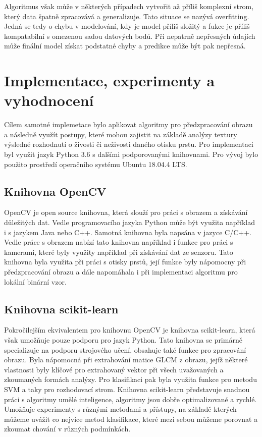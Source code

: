 Algoritmus však může v některých případech vytvořit až příliš komplexní strom, který data špatně zpracovává a generalizuje. Tato situace se nazývá overfitting. Jedná se tedy o chybu v modelování, kdy je model příliš složitý a fukce je příliš kompatabilní s omezenou sadou datových bodů. Při nepatrně nepřesných údajích může finální model získat podstatné chyby a predikce může být pak nepřesná.
    
\chapter{Implementace, experimenty a vyhodnocení}
Cílem samotné implemetace bylo aplikovat algoritmy pro předzpracování obrazu a následně využít postupy, které mohou zajistit na základě analýzy textury výsledné rozhodnutí o živosti či neživosti daného otisku prstu.
Pro implementaci byl využit jazyk Python 3.6 s dalšími podporovanými knihovnami. Pro vývoj bylo použito prostředí operačního systému Ubuntu 18.04.4 LTS.

\section{Knihovna OpenCV}
OpenCV je open source knihovna, která slouží pro práci s obrazem a získávání důležitých dat. Vedle programovacího jazyka Python může být využita například i s jazykem Java nebo C++. Samotná knihovna byla napsána v jazyce C/C++. \cite{OpenCVLibrary} Vedle práce s obrazem nabízí tato knihovna například i funkce pro práci s kamerami, které byly využity například při získávání dat ze senzoru. Tato knihovna byla využita při práci s otisky prstů, její funkce byly nápomocny při předzpracování obrazu a dále napomáhala i při implementaci algoritmu pro lokální binární vzor.

\section{Knihovna scikit-learn}
Pokročilejším ekvivalentem pro knihovnu OpenCV je knihovna scikit-learn, která však umožňuje pouze podporu pro jazyk Python. Tato knihovna se primárně specializuje na podporu strojového učení, obsahuje také funkce pro zpracování obrazu. Byla nápomocná při extrahování matice GLCM z obrazu, jejíž některé vlastnosti byly klíčové pro extrahovaný vektor při všech uvažovaných a zkoumaných formách analýzy. Pro klasifikaci pak byla využita funkce pro metodu SVM a taky pro rozhodovací strom. Knihovna scikit-learn představuje snadnou práci s algoritmy umělé inteligence, algoritmy jsou dobře optimalizované a rychlé. Umožňuje experimenty s různými metodami a přístupy, na základě kterých můžeme uvážit co nejvíce metod klasifikace, které mezi sebou můžeme porovnat a zkoumat chování v různých podmínkách.

